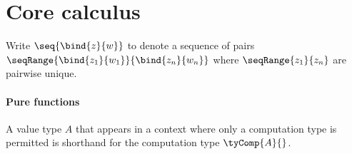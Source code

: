 \section{Core calculus}



\begin{definition}
   Write $\seq{\bind{z}{w}}$ to denote a sequence of pairs $\seqRange{\bind{z_1}{w_1}}{\bind{z_n}{w_n}}$ where $\seqRange{z_1}{z_n}$ are pairwise unique.
\end{definition}

\paragraph{Pure functions}

A value type $A$ that appears in a context where only a computation type is permitted is shorthand for the computation type $\tyComp{A}{}$.




